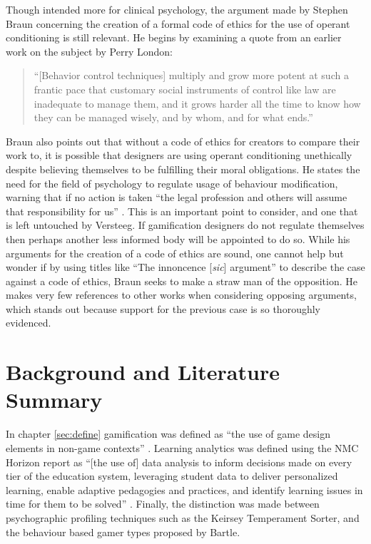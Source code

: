 \documentclass[12pt,a4paper,twoside]{report}
\begin{document}
Though intended more for clinical psychology, the argument made by Stephen Braun \cite{braun1975ethical} concerning the creation of a formal code of ethics for the use of operant conditioning is still relevant. He begins by examining a quote from an earlier work on the subject by Perry London:

\begin{quote}
	``[Behavior control techniques]
	multiply and grow more potent at such a frantic pace that customary
	social instruments of control like law are inadequate to
	manage them, and it grows harder all the time to know how
	they can be managed wisely, and by whom, and for what ends.''\cite{london1969behavioral}
\end{quote}

Braun also points out that without a code of ethics for creators to compare their work to, it is possible that designers are using operant conditioning unethically despite believing themselves to be fulfilling their moral obligations. He states the need for the field of psychology to regulate usage of behaviour modification, warning that if no action is taken ``the legal profession and others will assume that responsibility for us'' \cite{braun1975ethical}. This is an important point to consider, and one that is left untouched by Versteeg. If gamification designers do not regulate themselves then perhaps another less informed body will be appointed to do so. While his arguments for the creation of a code of ethics are sound, one cannot help but wonder if by using titles like ``The innoncence [\textit{sic}] argument'' to describe the case against a code of ethics, Braun seeks to make a straw man of the opposition. He makes very few references to other works when considering opposing arguments, which stands out because support for the previous case is so thoroughly evidenced.

\chapter{Background and Literature Summary}
In chapter \ref{sec:define} gamification was defined as ``the use of game design elements in non-game contexts'' \cite{deterding2011game}. Learning analytics was defined using the NMC Horizon report\cite{johnson2014nmc} as ``[the use of] data analysis to inform decisions made on every tier of the education system, leveraging student data to deliver personalized learning, enable adaptive pedagogies and practices, and identify learning issues in time for them to be solved'' \cite{johnson2014nmc}. Finally, the distinction was made between psychographic profiling techniques such as the Keirsey Temperament Sorter, and the behaviour based gamer types proposed by Bartle.
\end{document}
